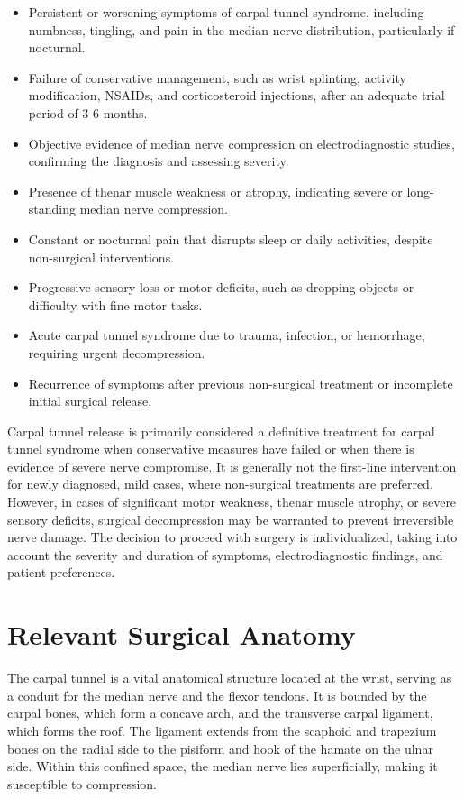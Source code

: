 \begin{itemize}
  \item Persistent or worsening symptoms of carpal tunnel syndrome, including numbness, tingling, and pain in the median nerve distribution, particularly if nocturnal.
  \item Failure of conservative management, such as wrist splinting, activity modification, NSAIDs, and corticosteroid injections, after an adequate trial period of 3-6 months.
  \item Objective evidence of median nerve compression on electrodiagnostic studies, confirming the diagnosis and assessing severity.
  \item Presence of thenar muscle weakness or atrophy, indicating severe or long-standing median nerve compression.
  \item Constant or nocturnal pain that disrupts sleep or daily activities, despite non-surgical interventions.
  \item Progressive sensory loss or motor deficits, such as dropping objects or difficulty with fine motor tasks.
  \item Acute carpal tunnel syndrome due to trauma, infection, or hemorrhage, requiring urgent decompression.
  \item Recurrence of symptoms after previous non-surgical treatment or incomplete initial surgical release.
\end{itemize}

Carpal tunnel release is primarily considered a definitive treatment for carpal tunnel syndrome when conservative measures have failed or when there is evidence of severe nerve compromise. It is generally not the first-line intervention for newly diagnosed, mild cases, where non-surgical treatments are preferred. However, in cases of significant motor weakness, thenar muscle atrophy, or severe sensory deficits, surgical decompression may be warranted to prevent irreversible nerve damage. The decision to proceed with surgery is individualized, taking into account the severity and duration of symptoms, electrodiagnostic findings, and patient preferences.

\section*{Relevant Surgical Anatomy}
The carpal tunnel is a vital anatomical structure located at the wrist, serving as a conduit for the median nerve and the flexor tendons. It is bounded by the carpal bones, which form a concave arch, and the transverse carpal ligament, which forms the roof. The ligament extends from the scaphoid and trapezium bones on the radial side to the pisiform and hook of the hamate on the ulnar side. Within this confined space, the median nerve lies superficially, making it susceptible to compression. 

